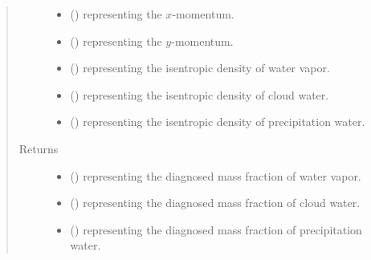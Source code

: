 \documentclass[letterpaper,10pt,english]{sphinxmanual}
\begin{document}
\begin{fulllineitems}
\begin{fulllineitems}
\begin{quote}
\begin{description}
\begin{itemize}
\item {} 
 () \textendash{}  representing the \(x\)-momentum.

\item {} 
 () \textendash{}  representing the \(y\)-momentum.

\item {} 
 () \textendash{}  representing the isentropic density of water vapor.

\item {} 
 () \textendash{}  representing the isentropic density of cloud water.

\item {} 
 () \textendash{}  representing the isentropic density of precipitation water.

\end{itemize}

\item[{Returns}] \leavevmode
\begin{itemize}
\item {} 
 () \textendash{}  representing the diagnosed mass fraction of water vapor.

\item {} 
 () \textendash{}  representing the diagnosed mass fraction of cloud water.

\item {} 
 () \textendash{}  representing the diagnosed mass fraction of precipitation water.

\end{itemize}


\end{description}\end{quote}

\end{fulllineitems}



\end{fulllineitems}
\end{document}
